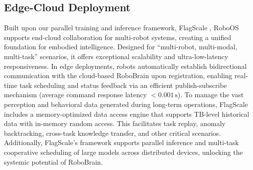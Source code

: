 \subsection{Edge-Cloud Deployment}
\label{subsec:edge-cloud}
Built upon our parallel training and inference framework, FlagScale \cite{FlagScale2024}, RoboOS supports end-cloud collaboration for multi-robot systems, creating a unified foundation for embodied intelligence. Designed for ``multi-robot, multi-modal, multi-task'' scenarios, it offers exceptional scalability and ultra-low-latency responsiveness. In edge deployments, robots automatically establish bidirectional communication with the cloud-based RoboBrain upon registration, enabling real-time task scheduling and status feedback via an efficient publish-subscribe mechanism (average command response latency $< 0.001 \, \text{s}$).
To manage the vast perception and behavioral data generated during long-term operations, FlagScale includes a memory-optimized data access engine that supports TB-level historical data with in-memory random access. This facilitates task replay, anomaly backtracking, cross-task knowledge transfer, and other critical scenarios. Additionally, FlagScale's framework supports parallel inference and multi-task cooperative scheduling of large models across distributed devices, unlocking the systemic potential of RoboBrain.
